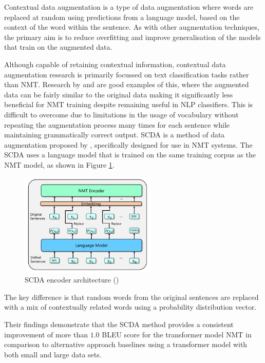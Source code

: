 Contextual data augmentation is a type of data augmentation where words are replaced at random using predictions from a language model, based on the context of the word within the sentence. As with other augmentation techniques, the primary aim is to reduce overfitting and improve generalisation of the models that train on the augmented data. 

Although capable of retaining contextual information, contextual data augmentation research is primarily focussed on text classification tasks rather than \acrshort{NMT}. Research by \cite{wu_conditional_2018} and \cite{kobayashi_contextual_2018} are good examples of this, where the augmented data can be fairly similar to the original data making it significantly less beneficial for \acrshort{NMT} training despite remaining useful in \acrshort{NLP} classifiers. This is difficult to overcome due to limitations in the usage of vocabulary without repeating the augmentation process many times for each sentence while maintaining grammatically correct output.
\acrfull{SCDA} is a method of data augmentation proposed by \cite{zhu_soft_2019}, specifically designed for use in \acrshort{NMT} systems. The \acrshort{SCDA} uses a language model that is trained on the same training corpus as the \acrshort{NMT} model, as shown in Figure \ref{fig:scda}.

\begin{figure}[ht!]
\centering
\includegraphics[width=0.58\textwidth]{media/literature/data_argumentation/da_scda.png}
\caption[Diagram of the \acrlong{SCDA} encoder architecture]{\acrlong{SCDA} encoder architecture (\cite{zhu_soft_2019})}
\label{fig:scda}
\end{figure}

The key difference is that random words from the original sentences are replaced with a mix of contextually related words using a probability distribution vector.




Their findings demonstrate that the \acrshort{SCDA} method provides a consistent improvement of more than $1.0$ BLEU score for the transformer model \acrshort{NMT} in comparison to alternative approach baselines using a transformer model with both small and large data sets.


